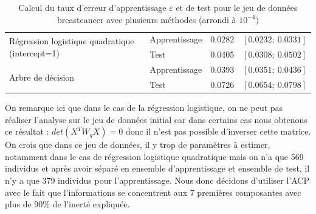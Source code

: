 \documentclass[a4paper,11pt,oneside,roman]{article}
\begin{document}
\begin{table}[H]
\begin{tabular}{l|l|cc}
\multirow{2}{*}{Régression logistique quadratique (intercept=1)}                  & Apprentissage    & 0.0282                            & $\left[0.0232 ;~ 0.0331\right]$  \\
                                       & Test             & 0.0405                                 & $\left[0.0308 ;~ 0.0502 \right]$ \\ \hline      
\multirow{2}{*}{Arbre de décision}                  & Apprentissage    & 0.0393                             & $\left[0.0351 ;~  0.0436 \right]$  \\
                                       & Test             & 0.0726                                 & $\left[0.0654 ;~ 0.0798 \right]$ 
\end{tabular}

\caption{Calcul du taux d'erreur d'apprentissage $\varepsilon$ et de test pour le jeu de données breastcancer avec plusieurs méthodes (arrondi à $10^{-4})$}
\label{breastcancer}
\end{table}
On remarque ici que dans le cas de la régression logistique, on ne peut pas réaliser l'analyse sur le jeu de données initial car dans certains cas nous obtenons ce résultat : $det(X^{T}W_{q}X) =  0$ donc il n'est pas possible d'inverser cette matrice. On crois que dans ce jeu de données, il y trop de paramètres à estimer, notamment dans le cas de régression logistique quadratique mais on n'a que 569 individus et après avoir séparé en ensemble d'apprentissage et ensemble de test, il n'y a que 379 individus pour l'apprentissage. Nous donc décidons d'utiliser l'ACP avec le fait que l'informations se concentrent aux 7 premières composantes avec plus de 90\% de l'inerté expliquée. \newline
\end{document}
